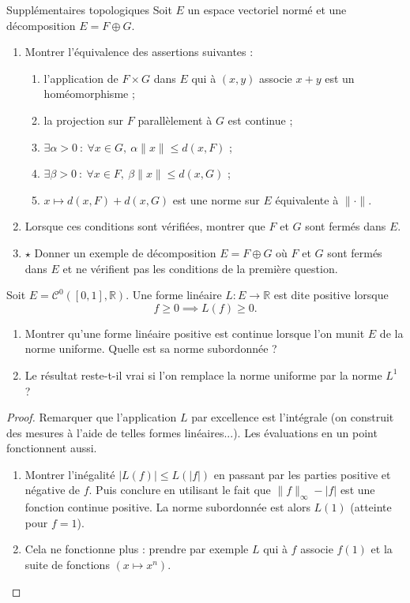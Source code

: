 \documentclass[french,a4paper]{article}
\newcommand{\R}{\mathbb{R}}
\theoremstyle{plain}
\theoremstyle{definition}
\theoremstyle{remark}
\begin{document}
\begin{ex}{Supplémentaires topologiques}
	Soit $E$ un espace vectoriel normé et une décomposition $E=F\oplus G$.
	\begin{enumerate}
		\item Montrer l'équivalence des assertions suivantes :
		\begin{enumerate}[label=(\roman*)]
			\item l'application de $F\times G$ dans $E$ qui à $(x,y)$ associe $x+y$ est un homéomorphisme ;
			\item la projection sur $F$ parallèlement à $G$ est continue ;
			\item $\exists\alpha>0\ : \ \forall x\in G,\ \alpha\lVert x\rVert \leqslant d(x,F)$ ;
			\item $\exists\beta>0\ : \ \forall x\in F,\ \beta\lVert x\rVert \leqslant d(x,G)$ ;
			\item $x\mapsto d(x,F)+d(x,G)$ est une norme sur $E$ équivalente à $\lVert\cdot\rVert$.
		\end{enumerate}
		\item Lorsque ces conditions sont vérifiées, montrer que $F$ et $G$ sont fermés dans $E$.
		\item $\star$ Donner un exemple de décomposition $E=F\oplus G$ où $F$ et $G$ sont fermés dans $E$ et ne vérifient pas les conditions de la première question.
	\end{enumerate}
\end{ex}

\begin{ex}{}
	Soit $E=\mathcal{C}^0([0,1],\R)$. Une forme linéaire $L:E\to\R$ est dite positive lorsque $$f\geqslant 0\implies L(f)\geqslant0.$$
	\begin{enumerate}
		\item Montrer qu'une forme linéaire positive est continue lorsque l'on munit $E$ de la norme uniforme. Quelle est sa norme subordonnée ?
		\item Le résultat reste-t-il vrai si l'on remplace la norme uniforme par la norme $L^1$ ?
	\end{enumerate}
\end{ex}
\begin{proof}
	Remarquer que l'application $L$ par excellence est l'intégrale (on construit des mesures à l'aide de telles formes linéaires...). Les évaluations en un point fonctionnent aussi.
	\begin{enumerate}
		\item Montrer l'inégalité $\lvert L(f)\rvert\leqslant L(\lvert f\rvert)$ en passant par les parties positive et négative de $f$. Puis conclure en utilisant le fait que $\lVert f\rVert_\infty-\lvert f\rvert$ est une fonction continue positive. La norme subordonnée est alors $L(1)$ (atteinte pour $f=1$).
		\item Cela ne fonctionne plus : prendre par exemple $L$ qui à $f$ associe $f(1)$ et la suite de fonctions $(x\mapsto x^n)$.
	\end{enumerate}
\end{proof}
\end{document}
